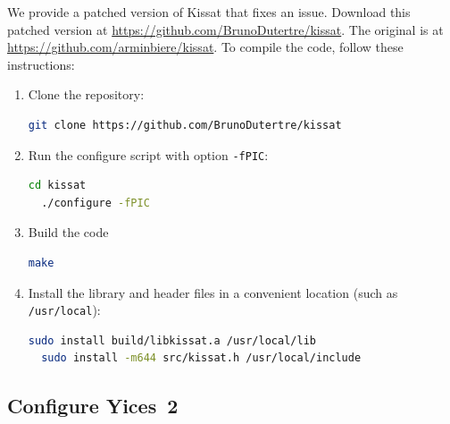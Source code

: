 \documentclass[11pt,twoside,fleqn,openright,titlepage]{cslreport}
\begin{document}
We provide a patched version of Kissat that fixes an issue. Download
this patched version at \url{https://github.com/BrunoDutertre/kissat}. The original is
at \url{https://github.com/arminbiere/kissat}. To compile the code, follow these instructions:
\begin{enumerate}
\item Clone the repository:
\begin{small}
\begin{lstlisting}[language=sh]
  git clone https://github.com/BrunoDutertre/kissat
\end{lstlisting}
\end{small}
\item Run the configure script with option \texttt{-fPIC}:
\begin{small}
\begin{lstlisting}[language=sh]
  cd kissat
  ./configure -fPIC
\end{lstlisting}
\end{small}
\item Build the code
\begin{small}
\begin{lstlisting}[language=sh]
  make
\end{lstlisting}
\end{small}
\item Install the library and header files in a convenient location (such as \texttt{/usr/local}):
\begin{small}
\begin{lstlisting}[language=sh]
  sudo install build/libkissat.a /usr/local/lib
  sudo install -m644 src/kissat.h /usr/local/include
\end{lstlisting}
\end{small}
\end{enumerate}

\subsection*{Configure Yices~2}
\end{document}

